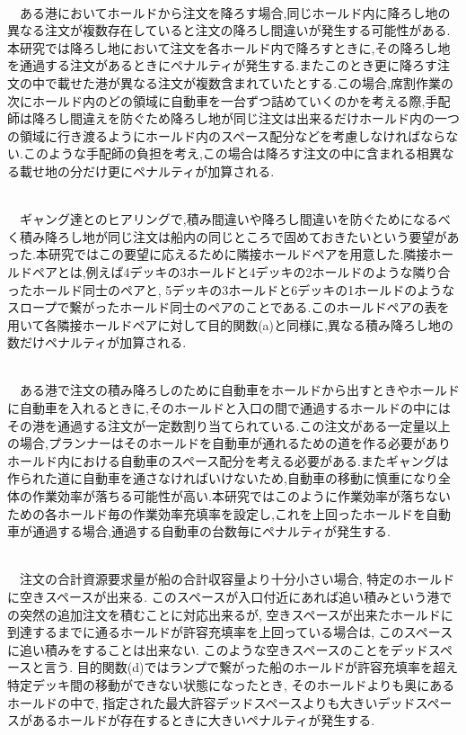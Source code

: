 \documentclass[a4j,11pt,twocolumn]{jsarticle}
\begin{document}
 \\
　ある港においてホールドから注文を降ろす場合,同じホールド内に降ろし地の異なる注文が複数存在していると注文の降ろし間違いが発生する可能性がある. 本研究では降ろし地において注文を各ホールド内で降ろすときに,その降ろし地を通過する注文があるときにペナルティが発生する.またこのとき更に降ろす注文の中で載せた港が異なる注文が複数含まれていたとする.この場合,席割作業の次にホールド内のどの領域に自動車を一台ずつ詰めていくのかを考える際,手配師は降ろし間違えを防ぐため降ろし地が同じ注文は出来るだけホールド内の一つの領域に行き渡るようにホールド内のスペース配分などを考慮しなければならない.このような手配師の負担を考え,この場合は降ろす注文の中に含まれる相異なる載せ地の分だけ更にペナルティが加算される.

 \\
　ギャング達とのヒアリングで,積み間違いや降ろし間違いを防ぐためになるべく積み降ろし地が同じ注文は船内の同じところで固めておきたいという要望があった.本研究ではこの要望に応えるために隣接ホールドペアを用意した.隣接ホールドペアとは,例えば4デッキの3ホールドと4デッキの2ホールドのような隣り合ったホールド同士のペアと, 5デッキの3ホールドと6デッキの1ホールドのようなスロープで繋がったホールド同士のペアのことである.このホールドペアの表を用いて各隣接ホールドペアに対して目的関数(a)と同様に,異なる積み降ろし地の数だけペナルティが加算される.

 \\
　ある港で注文の積み降ろしのために自動車をホールドから出すときやホールドに自動車を入れるときに,そのホールドと入口の間で通過するホールドの中にはその港を通過する注文が一定数割り当てられている.この注文がある一定量以上の場合,プランナーはそのホールドを自動車が通れるための道を作る必要がありホールド内における自動車のスペース配分を考える必要がある.またギャングは作られた道に自動車を通さなければいけないため,自動車の移動に慎重になり全体の作業効率が落ちる可能性が高い.本研究ではこのように作業効率が落ちないための各ホールド毎の作業効率充填率を設定し,これを上回ったホールドを自動車が通過する場合,通過する自動車の台数毎にペナルティが発生する.

 \\
　注文の合計資源要求量が船の合計収容量より十分小さい場合, 特定のホールドに空きスペースが出来る. このスペースが入口付近にあれば追い積みという港での突然の追加注文を積むことに対応出来るが, 空きスペースが出来たホールドに到達するまでに通るホールドが許容充填率を上回っている場合は, このスペースに追い積みをすることは出来ない. このような空きスペースのことをデッドスペースと言う. 目的関数(d)ではランプで繋がった船のホールドが許容充填率を超え特定デッキ間の移動ができない状態になったとき, そのホールドよりも奥にあるホールドの中で, 指定された最大許容デッドスペースよりも大きいデッドスペースがあるホールドが存在するときに大きいペナルティが発生する. \\
\end{document}
